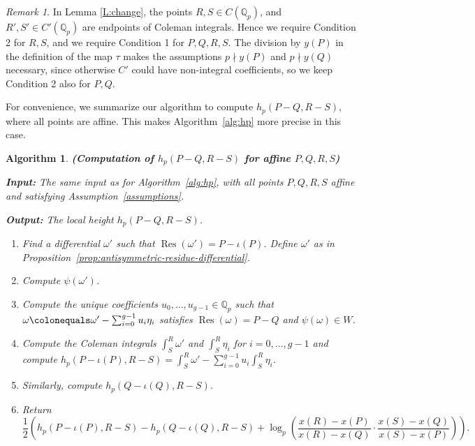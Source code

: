\documentclass[11pt, a4paper]{amsart}
\newcommand{\Q}{\mathbb{Q}}
\newcommand{\Res}{\operatorname{Res}}
\newtheorem{alg}[theorem]{Algorithm}
\theoremstyle{remark}
\newtheorem{remark}[theorem]{Remark}
\numberwithin{equation}{section}
\newcommand{\sg}{{}}
\newcommand{\sm}{{}}
\begin{document}
\begin{remark}\label{stepivcond2}
\sm{
In Lemma \ref{L:change}, the points $R, S\in
C(\Q_p)$, and $R',S'\in C'(\Q_p)$ are endpoints of Coleman integrals. 
Hence we
require Condition 2 \sg{for $R,S$}, and we require 
Condition
\sg{1} for $P,Q,R,S$. The division by $y(P)$ in the
definition of the map $\tau$ makes the assumptions $p\nmid y(P)$ and $p\nmid y(Q)$
necessary, since otherwise $C'$ could have non-integral coefficients, so we keep Condition 2 also for $P,Q$. }
\end{remark}

\sm{For convenience, we summarize our algorithm to compute
$h_p(P-Q, R-S)$, where all points are affine. This makes
Algorithm~\ref{alg:hp} more precise in this case.}
\sg{
\begin{alg} \label{alg:hp-affine}  {\bf (Computation of $h_p(P-Q, R-S)$ for
  affine $P,Q,R,S$)}
\hfill

 {\bf Input:} The same input as for Algorithm~\ref{alg:hp}, with all points
      $P,Q,R,S$ affine and satisfying Assumption~\ref{assumptions}.

{\bf Output:} The local height $h_p(P-Q, R-S)$.
\begin{enumerate}
\item Find a differential $\omega'$ such that $\Res(\omega')=P-\iota(P)$. Define  $\omega'$ as  in Proposition~\ref{prop:antisymmetric-residue-differential}.
  \item\label{affine:psi} Compute $\psi(\omega')$.
\item  Compute the unique coefficients $u_0,\ldots,u_{g-1}\in
  \Q_p$ 
    such that
   \sg{$\omega\colonequals \omega' -\sum^{g-1}_{i=0}u_i\eta_i$} satisfies $\Res(\omega)=P-Q$ and $\psi(\omega)\in W$.
\item  Compute the Coleman integrals $\int_S ^R \omega'$ and \sg{$\int_S ^R \eta_i$} for
  $i=0,\ldots,g-1$ and compute $h_p(P-\iota(P),R-S) =\int^R_S\omega'-\sum^{g-1}_{i=0}u_i\int^R_S\eta_i$.
\item Similarly, compute $h_p(Q-\iota(Q),R-S)$.
\item\label{affine:final-formula} Return
$$\dfrac{1}{2}\left(h_p(P-\iota(P),R-S)-h_p(Q-\iota(Q),R-S) +
    \log_p\left(\dfrac{x(R)-x(P)}{x(R)-x(Q)}\cdot \dfrac{x(S)-x(Q)}{x(S)-x(P)}\right)\right).$$
\end{enumerate}
\end{alg}}
\end{document}
